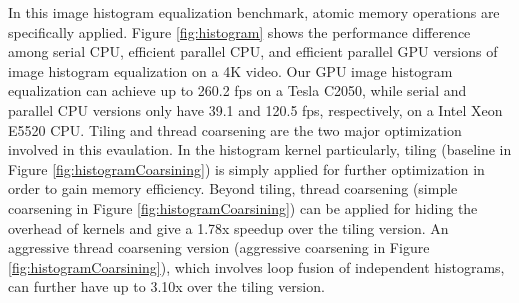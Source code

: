 In this image histogram equalization benchmark, atomic memory operations are specifically applied. 
Figure \ref{fig:histogram} shows the performance difference among serial CPU, efficient parallel CPU, and efficient parallel GPU versions of image histogram equalization on a 4K video.
Our GPU image histogram equalization can achieve up to 260.2 fps on a Tesla C2050, while serial and parallel CPU versions only have 39.1 and 120.5 fps, respectively, on a Intel Xeon E5520 CPU.
Tiling and thread coarsening are the two major optimization involved in this evaulation.
In the histogram kernel particularly, tiling (baseline in Figure \ref{fig:histogramCoarsining}) is simply applied for further optimization in order to gain memory efficiency.
Beyond tiling, thread coarsening (simple coarsening in Figure \ref{fig:histogramCoarsining}) can be applied for hiding the overhead of kernels and give a 1.78x speedup over the tiling version.
An aggressive thread coarsening version (aggressive coarsening in Figure \ref{fig:histogramCoarsining}), which involves loop fusion of independent histograms, can further have up to 3.10x over the tiling version.
